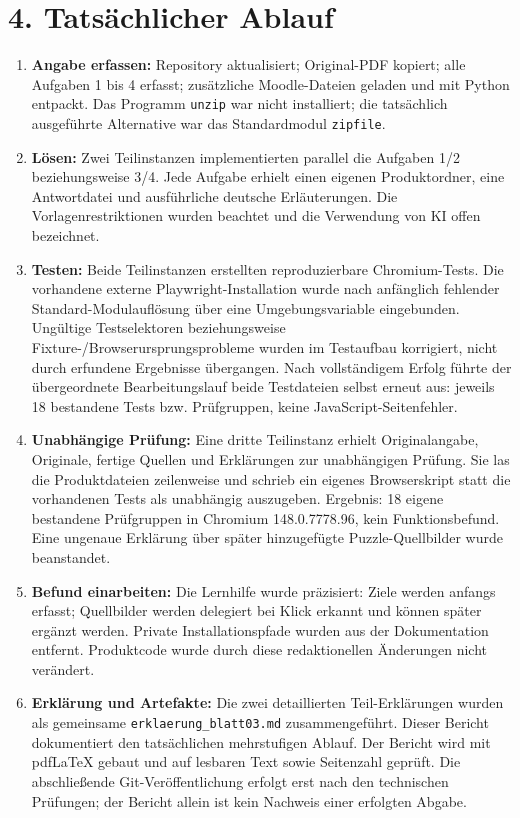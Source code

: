 \documentclass[11pt,a4paper]{article}
\begin{document}
\section*{4. Tatsächlicher Ablauf}
\begin{enumerate}
\item \textbf{Angabe erfassen:} Repository aktualisiert; Original-PDF kopiert; alle Aufgaben 1 bis 4 erfasst; zusätzliche Moodle-Dateien geladen und mit Python entpackt. Das Programm \texttt{unzip} war nicht installiert; die tatsächlich ausgeführte Alternative war das Standardmodul \texttt{zipfile}.
\item \textbf{Lösen:} Zwei Teilinstanzen implementierten parallel die Aufgaben 1/2 beziehungsweise 3/4. Jede Aufgabe erhielt einen eigenen Produktordner, eine Antwortdatei und ausführliche deutsche Erläuterungen. Die Vorlagenrestriktionen wurden beachtet und die Verwendung von KI offen bezeichnet.
\item \textbf{Testen:} Beide Teilinstanzen erstellten reproduzierbare Chromium-Tests. Die vorhandene externe Playwright-Installation wurde nach anfänglich fehlender Standard-Modulauflösung über eine Umgebungsvariable eingebunden. Ungültige Testselektoren beziehungsweise Fixture-/Browserursprungsprobleme wurden im Testaufbau korrigiert, nicht durch erfundene Ergebnisse übergangen. Nach vollständigem Erfolg führte der übergeordnete Bearbeitungslauf beide Testdateien selbst erneut aus: jeweils 18 bestandene Tests bzw. Prüfgruppen, keine JavaScript-Seitenfehler.
\item \textbf{Unabhängige Prüfung:} Eine dritte Teilinstanz erhielt Originalangabe, Originale, fertige Quellen und Erklärungen zur unabhängigen Prüfung. Sie las die Produktdateien zeilenweise und schrieb ein eigenes Browserskript statt die vorhandenen Tests als unabhängig auszugeben. Ergebnis: 18 eigene bestandene Prüfgruppen in Chromium 148.0.7778.96, kein Funktionsbefund. Eine ungenaue Erklärung über später hinzugefügte Puzzle-Quellbilder wurde beanstandet.
\item \textbf{Befund einarbeiten:} Die Lernhilfe wurde präzisiert: Ziele werden anfangs erfasst; Quellbilder werden delegiert bei Klick erkannt und können später ergänzt werden. Private Installationspfade wurden aus der Dokumentation entfernt. Produktcode wurde durch diese redaktionellen Änderungen nicht verändert.
\item \textbf{Erklärung und Artefakte:} Die zwei detaillierten Teil-Erklärungen wurden als gemeinsame \texttt{erklaerung\_blatt03.md} zusammengeführt. Dieser Bericht dokumentiert den tatsächlichen mehrstufigen Ablauf. Der Bericht wird mit pdfLaTeX gebaut und auf lesbaren Text sowie Seitenzahl geprüft. Die abschließende Git-Veröffentlichung erfolgt erst nach den technischen Prüfungen; der Bericht allein ist kein Nachweis einer erfolgten Abgabe.
\end{enumerate}
\end{document}

